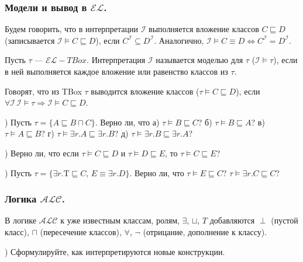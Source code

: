 \documentclass[12pt]{article}
\begin{document}
\subsubsection*{Модели и вывод в $\mathcal{EL}$.}
Будем говорить, что в интерпретации $\mathcal{I}$ выполняется вложение классов $C\sqsubseteq D$
(записывается $\mathcal{I} \vDash C\sqsubseteq D$), если
$C^\mathcal{I} \subseteq D^\mathcal{I}$.
Аналогично, $\mathcal{I} \vDash C\equiv D \Leftrightarrow C^\mathcal{I} = D^\mathcal{I}$.

Пусть $\tau$ --- $\mathcal{EL}-TBox$. Интерпретация $\mathcal{I}$ называется моделью для $\tau$
($\mathcal{I} \vDash \tau$),
если в ней выполняется каждое вложение или равенство классов из $\tau$.

Говорят, что из TBox $\tau$ выводится вложение классов ($\tau \vDash C\sqsubseteq D$), если
$\forall\mathcal{I} \, \mathcal{I}\vDash\tau \Rightarrow \mathcal{I}\vDash C\sqsubseteq D$.

\z) Пусть $\tau = \{A \sqsubseteq B \sqcap C\}$.
Верно ли, что 
а) $\tau \vDash B \sqsubseteq C$?
б) $\tau \vDash B \sqsubseteq A$?
в) $\tau \vDash A \sqsubseteq B$?
г) $\tau \vDash \exists r . A \sqsubseteq \exists r . B$?
д) $\tau \vDash \exists r . B \sqsubseteq \exists r . A$?


\z) Верно ли, что если $\tau\vDash C\sqsubseteq D$ и $\tau\vDash D\sqsubseteq E$, то
$\tau\vDash C\sqsubseteq E$?

\z) Пусть $\tau = \{\exists r.\mathrm{T} \sqsubseteq C,\, E \equiv \exists r.D\}$. %
Верно ли, что $\tau \vDash E \sqsubseteq C$? $\tau \vDash \exists r.C \sqsubseteq C$?




\subsubsection*{Логика $\mathcal{ALC}$.}
В логике $\mathcal{ALC}$ к уже известным классам, ролям, $\exists$, $\sqcup$, $T$
добавляются $\perp$ (пустой класс), $\sqcap$ (пересечение классов), $\forall$, $\lnot$
(отрицание, дополнение к классу).

) Сформулируйте, как интерпретируются новые конструкции.
\end{document}
